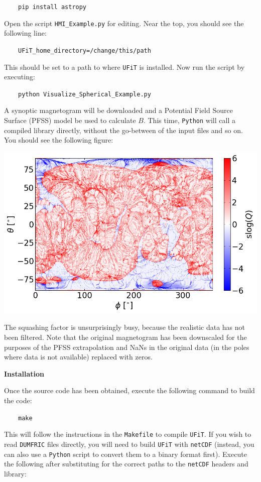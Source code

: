 \documentclass[12pt,twoside]{article}
\begin{document}
$\quad\quad$\texttt{pip install astropy}

Open the script \texttt{HMI\_Example.py} for editing. Near the top, you should see the following line:

$\quad\quad$\texttt{UFiT\_home\_directory=\textquotesingle /change/this/path\textquotesingle }

This should be set to a path to where \texttt{UFiT} is installed. Now run the script by executing: 

$\quad\quad$\texttt{python Visualize\_Spherical\_Example.py}

A synoptic magnetogram will be downloaded and a Potential Field Source Surface (PFSS) model be used to calculate $B$. This time, \texttt{Python} will call a compiled library directly, without the go-between of the input files and so on. You should see the following figure:

\begin{center}
\includegraphics[scale=0.6]{HMI_Example.png}
\end{center}

The squashing factor is unsurprisingly busy, because the realistic data has not been filtered. Note that the original magnetogram has been downscaled for the purposes of the PFSS extrapolation and NaNs in the original data (in the poles where data is not available) replaced with zeros.


\vspace{2mm}
{\Large \textbf{Installation}}

Once the source code has been obtained, execute the following command to build the code:

$\quad\quad$\texttt{make}

This will follow the instructions in the \texttt{Makefile} to compile \texttt{UFiT}. If you wish to read \texttt{DUMFRIC} files directly, you will need to build \texttt{UFiT} with \texttt{netCDF} (instead, you can also use a \texttt{Python} script to convert them to a binary format first). Execute the following after substituting for the correct paths to the \texttt{netCDF} headers and library:
\end{document}
